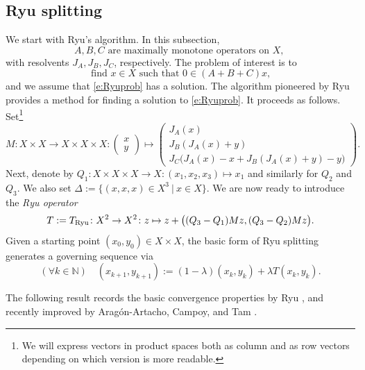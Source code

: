 \documentclass[11pt]{article}
\newcommand{\kkk}{\ensuremath{{k\in{\mathbb N}}}}
\newcommand{\menge}[2]{\big\{{#1}~\big |~{#2}\big\}}
\newcommand{\tryu}{\ensuremath{T_{\text{\scriptsize Ryu}}}}
\theoremstyle{definition}
\begin{document}
{\label{sec:known}


\subsection{Ryu splitting}


We start with Ryu's algorithm. In this subsection, 
\begin{equation*}
\text{$A,B,C$ are maximally monotone operators on 
$X$, 
}
\end{equation*}
with resolvents $J_A,J_B,J_C$, respectively.
The problem of interest is to 
\begin{equation}
\label{e:Ryuprob}
\text{find $x\in X$ such that $0\in (A+B+C)x$,}
\end{equation}
and we assume that \cref{e:Ryuprob} has a solution. 
The algorithm pioneered by Ryu  \cite{Ryu} provides a method
for finding a solution to \cref{e:Ryuprob}.
It proceeds as follows. Set\footnote{We will express vectors in
product spaces both as column and as row vectors depending 
on which version is more readable.}
\begin{equation}
\label{e:genM}
M\colon X\times X\to X\times X\times X\colon
\begin{pmatrix}
x\\
y
\end{pmatrix}
\mapsto
\begin{pmatrix}
J_A(x)\\[+1mm]
J_B(J_A(x)+y)\\[+1mm]
J_C\big(J_A(x)-x+J_B(J_A(x)+y)-y\big) 
\end{pmatrix}. 
\end{equation}
Next, denote by $Q_1\colon X\times X\times X\to X\colon 
(x_1,x_2,x_3)\mapsto x_1$
and similarly for $Q_2$ and $Q_3$. 
We also set $\Delta := \menge{(x,x,x)\in X^3}{x\in X}$. 
We are now ready to introduce the \emph{Ryu operator}
\begin{equation}
\label{e:TRyu}
T := \tryu \colon X^2\to X^2\colon 
z\mapsto 
z + \big((Q_3-Q_1)Mz,(Q_3-Q_2)Mz\big). 
\end{equation}
Given a starting point $(x_0,y_0)\in X\times X$, 
the basic form of 
Ryu splitting generates a governing sequence via
\begin{equation}
\label{e:basicRyu}
(\forall \kkk)\quad (x_{k+1},y_{k+1}) := 
(1-\lambda)(x_k,y_k) + \lambda T(x_k,y_k).
\end{equation}

The following result records the basic convergence properties 
by Ryu \cite{Ryu}, 
and recently improved by Arag\'on-Artacho, Campoy, and Tam \cite{AACT20}. 

}
\end{document}
